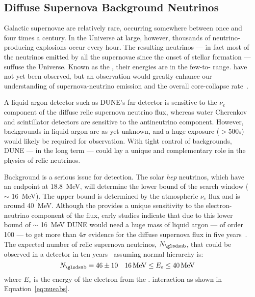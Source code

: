 \subsection{Diffuse Supernova Background Neutrinos}

Galactic supernovae are relatively rare, occurring somewhere between
once and four times a century. In the Universe
at large, however, thousands of neutrino-producing explosions occur
every hour.  The resulting neutrinos --- in fact most of the neutrinos
emitted by all the supernovae since the onset of stellar formation ---
suffuse the Universe.  Known as the %
, their energies are in the few-to- range.  
have not yet been observed, but an observation would greatly enhance
our understanding of supernova-neutrino emission and the overall
core-collapse rate~\cite{Beacom:2010kk}.


A liquid argon detector such as DUNE's far detector is sensitive to
the $\nu_e$ component of the diffuse relic supernova neutrino flux,
whereas water Cherenkov and scintillator detectors are sensitive to
the antineutrino component.  However, backgrounds in liquid argon are as
yet unknown, and a huge exposure ($>$\SI{500}{\ktyr}s)
would likely be required for observation.  
With tight control of
backgrounds, 
DUNE --- in the long term --- could 
lay a unique and
 complementary role in the physics of relic neutrinos.


Background is a serious issue for  detection.
The solar {\em hep} neutrinos, which have an                
endpoint at \SI{18.8}{\MeV}, will determine the lower bound of the 
search window ($\sim$ \SI{16}{\MeV}).  The upper bound is determined
by the atmospheric ${\nu}_{e}$ flux and
is around \SI{40}{MeV}.
Although the  provides a unique sensitivity to the
electron-neutrino component of the  flux, early studies indicate
that due to this lower bound of $\sim$ \SI{16}{\MeV} DUNE would need a huge
mass of liquid argon --- of order \SI{100}{\kt} --- to get more than 4$\sigma$
evidence for the diffuse supernova flux in five
years~\cite{Cocco:2004ac}.
%
The expected number of relic
supernova neutrinos, $N_{\rm \dword{dsnb}}$, that could be observed in a
  detector in ten years~\cite{Cocco:2004ac}
assuming normal hierarchy is:
\begin{equation}
N_{\rm \dword{dsnb}} = 46 \pm 10  \ \ \ 16 \, {\rm MeV} \leq E_e \leq 40 \, {\rm MeV}
\label{eqn:srnrate}
\end{equation}
where $E_e$ is the energy of the electron from the . interaction as
shown in Equation~\ref{eq:nueabs}. 

